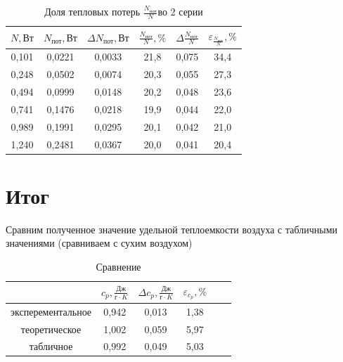\documentclass[a4paper]{article}
\begin{document}
\begin{enumerate}
\begin{table}[h!] 
	\caption{Доля тепловых потерь $\frac{N_{\text{пот}}}{N}$во 2 серии}
	\begin{center}
		\begin{tabular}{|*{6}{c|}}
			\hline
			$N,  \text{Вт} $ & $N_{\text{пот}}, \text{Вт}$ & $\Delta N_{\text{пот}}, \text{Вт}$ & $\frac{N_{\text{пот}}}{N}, \%$ & $\Delta \frac{N_{\text{пот}}}{N}$ & $\varepsilon_{\frac{N_{\text{пот}}}{N}}, \%$\\ \hline
			0,101&	0,0221&	0,0033&21,8 &	0,075&	34,4\\ \hline
			0,248&	0,0502&	0,0074&	20,3 &	0,055&	27,3\\ \hline
			0,494&	0,0999&	0,0148&	20,2 &	0,048&	23,6\\ \hline
			0,741&	0,1476&	0,0218&	19,9 &	0,044&	22,0\\ \hline
			0,989&	0,1991&	0,0295&20,1 &	0,042&	21,0\\ \hline
			1,240&	0,2481&	0,0367&	20,0 &	0,041&	20,4\\ \hline
					\end{tabular}
	\end{center}
\end{table}

\section{Итог}
Сравним полученное значение удельной теплоемкости воздуха с табличными значениями (сравниваем с сухим воздухом)

\begin{table}[h!] 
	\caption{Сравнение }
	\begin{center}
		\begin{tabular}{|*{6}{c|}}
			\hline
			& $c_{p}, \frac{\text{Дж}}{г\cdot K}$ & $\Delta c_{p}, \frac{\text{Дж}}{г\cdot K}$ & $\varepsilon_{c_{p}}, \%$ \\ \hline
			эксперементальное & 0,942&	0,013	&1,38\\ \hline
			теоретическое&1,002	&0,059&5,97\\ \hline
			табличное&0,992	&0,049	&5,03\\ \hline
		\end{tabular}
	\end{center}
\end{table}

\end{enumerate}
\end{document}
